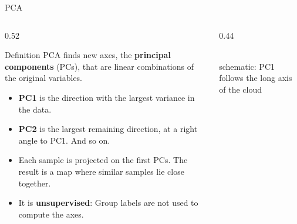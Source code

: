 \documentclass[aspectratio=169,10pt]{beamer}
\newcommand{\hl}[1]{{\color{warm}\bfseries #1}}
\begin{document}
\begin{frame}{PCA}
  \begin{columns}[T]
    \begin{column}{0.52\textwidth}
      \begin{block}{Definition}
        PCA finds new axes, the \hl{principal components} (PCs), that are linear combinations of the original variables.
      \end{block}
      \begin{itemize}\setlength\itemsep{1.5mm}
        \item \hl{PC1} is the direction with the largest variance in the data.
        \item \hl{PC2} is the largest remaining direction, at a right angle to PC1. And so on.
        \item Each sample is projected on the first PCs. The result is a map where similar samples lie close together.
        \item It is \hl{unsupervised}: Group labels are not used to compute the axes.
      \end{itemize}
    \end{column}
    \begin{column}{0.44\textwidth}
      \begin{center}
      \\[-1mm]
      {\scriptsize schematic: PC1 follows the long axis of the cloud}
      \end{center}
    \end{column}
  \end{columns}
\end{frame}
\end{document}
